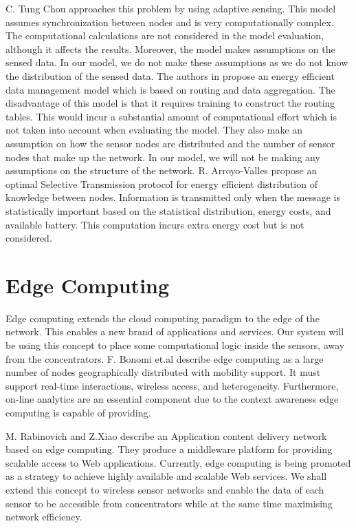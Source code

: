 \documentclass{mproj}
\begin{document}
C. Tung Chou \cite{informationCollection} approaches this problem by using adaptive sensing. This model assumes synchronization between nodes and is very computationally complex. The computational calculations are not considered in the model evaluation, although it affects the results. Moreover, the model makes assumptions on the sensed data. In our model, we do not make these assumptions as we do not know the distribution of the sensed data. The authors in \cite{energyEfficientDataManagement} propose an energy efficient data management model which is based on routing and data aggregation. The disadvantage of this model is that it requires training to construct the routing tables. This would incur a substantial amount of computational effort which is not taken into account when evaluating the model. They also make an assumption on how the sensor nodes are distributed and the number of sensor nodes that make up the network. In our model, we will not be making any assumptions on the structure of the network. R. Arroyo-Valles \cite{optimalSelective} propose an optimal Selective Transmission protocol for energy efficient distribution of knowledge between nodes. Information is transmitted only when the message is statistically important based on the statistical distribution, energy costs, and available battery. This computation incurs extra energy cost but is not considered.

\section{Edge Computing}
Edge computing extends the cloud computing paradigm to the edge of the network. This enables a new brand of applications and services. Our system will be using this concept to place some computational logic inside the sensors, away from the concentrators. F. Bonomi et.al \cite{fogComputing} describe edge computing as a large number of nodes geographically distributed with mobility support. It must support real-time interactions, wireless access, and heterogeneity. Furthermore, on-line analytics are an essential component due to the context awareness edge computing is capable of providing. 

M. Rabinovich and Z.Xiao \cite{replicatingInternetApplications} describe an Application content delivery network based on edge computing. They produce a middleware platform for providing scalable access to Web applications. Currently, edge computing is being promoted as a strategy to achieve highly available and scalable Web services. \cite{authenticatingQueries} We shall extend this concept to wireless sensor networks and enable the data of each sensor to be accessible from concentrators while at the same time maximising network efficiency.
\end{document}

